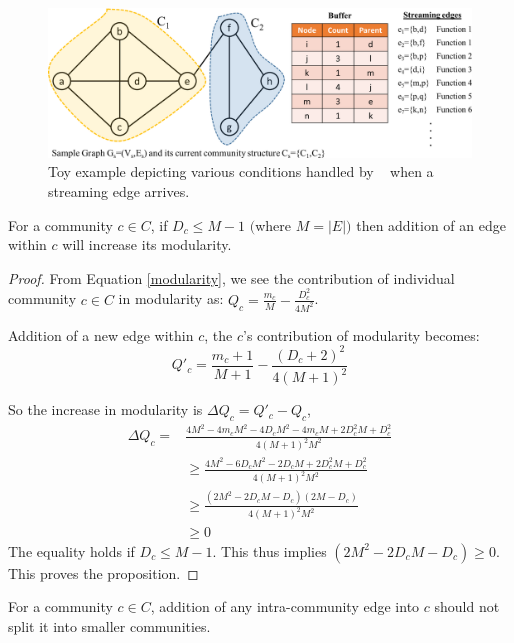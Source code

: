 \begin{figure}[!t]
\centering
\includegraphics[width=\columnwidth]{./texfiles/Chapter_2/figures/demo.eps}
\caption{Toy example depicting various conditions handled by \compas~ when a streaming edge arrives.}\label{fig_algo} 
\end{figure}

\begin{prop}\label{1}
For a community $c\in C$, if $D_c\leq M-1$ $($where $M=|E|)$ then addition of an edge within $c$ will increase its modularity.
\end{prop}


\begin{proof}
From Equation \ref{modularity}, we see the contribution of individual community $c\in C$ in modularity as: $Q_c=\frac{m_c}{M} - \frac{D_c^2}{4M^2}$. 

Addition of a new edge within $c$, the $c$'s contribution of modularity becomes:
\[
Q'_c=\frac{m_c+1}{M+1} - \frac{(D_c+2)^2}{4(M+1)^2}
\]

So the increase in modularity is $\Delta Q_c=Q'_c-Q_c$,
\[
\begin{split}
\Delta Q_c=&\frac{4M^2-4m_cM^2-4D_cM^2-4m_cM+2D_c^2M+D_c^2}{4(M+1)^2M^2}\\
&\geq \frac{4M^2-6D_cM^2-2D_cM+2D_c^2M+D_c^2}{4(M+1)^2M^2}\\
&\geq\frac{(2M^2-2D_cM-D_c)(2M-D_c)}{4(M+1)^2M^2}\\
&\geq 0
\end{split}
\]
The equality holds if $D_c\leq M-1$. This thus implies $(2M^2-2D_cM-D_c)\geq 0$. This proves the proposition.
\end{proof}



\begin{prop}\label{2}
For a community $c\in C$, addition of any intra-community edge into $c$ should not split it into smaller communities.
\end{prop}




